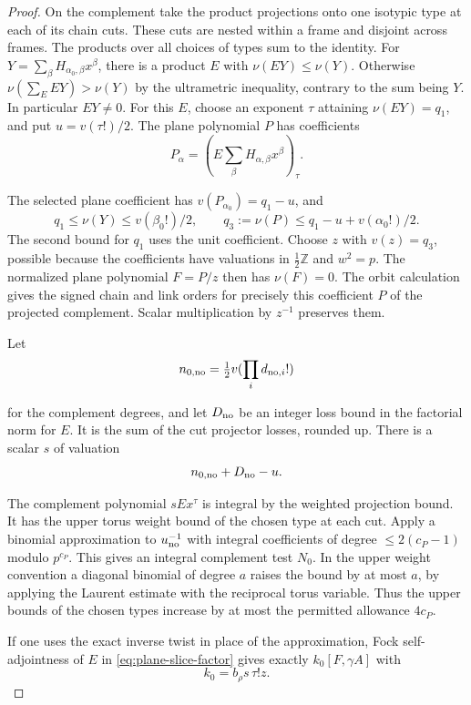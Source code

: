 \begin{proof}
On the complement take the product projections onto one
isotypic type at each of its chain cuts. These cuts are
nested within a frame and disjoint across frames.
The products over all choices of types sum to the identity.
For \(Y=\sum_\beta H_{\alpha_0,\beta}x^\beta\), there is a
product \(E\) with \(\nu(EY)\le\nu(Y)\). Otherwise
\(\nu(\sum_E EY)>\nu(Y)\) by the ultrametric inequality,
contrary to the sum being \(Y\). In particular \(EY\ne0\).
For this \(E\), choose an exponent \(\tau\) attaining
\(\nu(EY)=q_1\), and put \(u=v(\tau!)/2\). The plane
polynomial \(P\) has coefficients
\[
 P_\alpha=\left(E\sum_\beta H_{\alpha,\beta}x^\beta\right)_\tau .
\]

The selected plane coefficient has \(v(P_{\alpha_0})=q_1-u\), and
\[
 q_1\le\nu(Y)\le v(\beta_0!)/2,\qquad
 q_3:=\nu(P)\le q_1-u+v(\alpha_0!)/2 .
\]
The second bound for \(q_1\) uses the unit coefficient.
Choose \(z\) with \(v(z)=q_3\), possible because the
coefficients have valuations in \(\frac12\mathbb Z\)
and \(w^2=p\). The normalized plane polynomial \(F=P/z\)
then has \(\nu(F)=0\). The orbit calculation gives the signed chain and link
orders for precisely this coefficient \(P\) of the projected
complement. Scalar multiplication by \(z^{-1}\) preserves them.

Let
\[
 n_{0,{\rm no}}=\tfrac12v(\prod_i d_{{\rm no},i}!)
\]

for the complement degrees, and let \(D_{\rm no}\) be an
integer loss bound in the factorial norm for \(E\).
It is the sum of the cut projector losses, rounded up.
There is a scalar \(s\) of valuation
\[
 n_{0,{\rm no}}+D_{\rm no}-u.
\]

The complement polynomial \(s E x^\tau\) is integral
by the weighted projection bound. It has the upper torus
weight bound of the chosen type at each cut. Apply a binomial
approximation to \(u_{\rm no}^{-1}\) with integral coefficients
of degree \(\le 2(c_P-1)\) modulo \(p^{c_P}\).
This gives an integral complement test \(N_0\). In the upper
weight convention a diagonal binomial of degree \(a\) raises
the bound by at most \(a\), by applying the Laurent estimate
with the reciprocal torus variable. Thus the upper bounds of the chosen types increase by at most the permitted allowance \(4c_P\).

If one uses the exact inverse twist in place of the
approximation, Fock self-adjointness of \(E\) in
\eqref{eq:plane-slice-factor} gives exactly
\(k_0[F,\gamma A]\) with
\[
 k_0=b_\rho s\,\tau!z.
\]


\end{proof}

